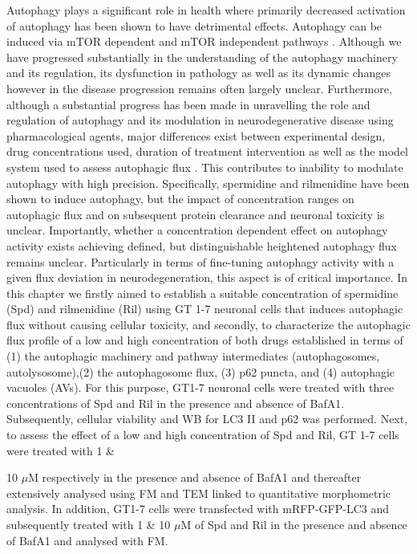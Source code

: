 Autophagy plays a significant role in health where primarily decreased activation of autophagy has been shown to have detrimental effects. Autophagy can be induced via mTOR dependent and mTOR independent pathways \citep{sarkar2013}. Although we have progressed substantially in the understanding of the autophagy machinery and its regulation, its dysfunction in pathology as well as its dynamic changes however in the disease progression remains often largely unclear. Furthermore, although a substantial progress has been made in unravelling the role and regulation of autophagy and its modulation in neurodegenerative disease using pharmacological agents, major differences exist between experimental design, drug concentrations used, duration of treatment intervention as well as the model system used to assess autophagic flux \citep{lumkwana2017}. This contributes to inability to modulate autophagy with high precision. Specifically, spermidine and rilmenidine have been shown to induce autophagy, but the impact of concentration ranges on autophagic flux and on subsequent protein clearance and neuronal toxicity is unclear. Importantly, whether a concentration dependent effect on autophagy activity exists achieving defined, but distinguishable heightened autophagy flux remains unclear. Particularly in terms of fine-tuning autophagy activity with a given flux deviation in neurodegeneration, this aspect is of critical importance. In this chapter we firstly aimed to establish a suitable concentration of spermidine (Spd) and rilmenidine (Ril) using GT 1-7 neuronal cells that induces autophagic flux without causing cellular toxicity, and secondly, to characterize the autophagic flux profile of a low and high concentration of both drugs established in terms of (1) the autophagic machinery and pathway intermediates (autophagosomes, autolysosome),(2) the autophagosome flux, (3) p62 puncta, and (4) autophagic vacuoles (AVs). For this purpose, GT1-7 neuronal cells were treated with three concentrations of Spd and Ril in the presence and absence of BafA1. Subsequently, cellular viability and WB for LC3 II and p62 was performed. Next, to assess the effect of a low and high concentration of Spd and Ril, GT 1-7 cells were treated with 1 \& {10 $\mu$M respectively in the presence and absence of BafA1 and thereafter extensively analysed using FM and TEM linked to quantitative morphometric analysis. In addition, GT1-7 cells were transfected with mRFP-GFP-LC3 \citep{yoshii2017} and subsequently treated with 1 \& 10 $\mu$M of Spd and Ril in the presence and absence of BafA1 and analysed with FM.
 
}
